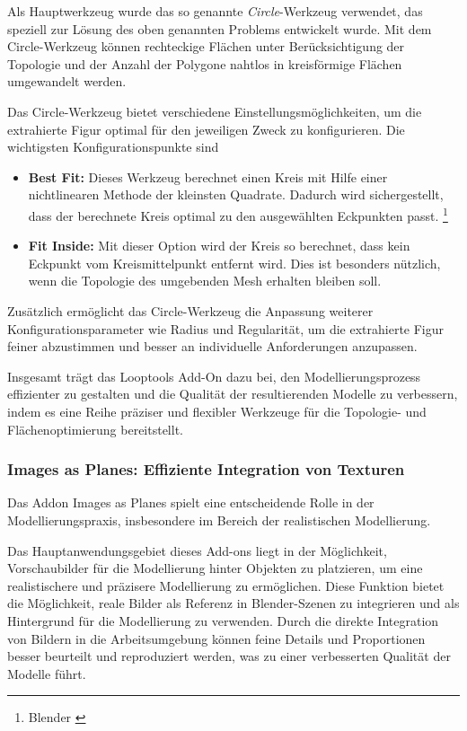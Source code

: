 Als Hauptwerkzeug wurde das so genannte \textit{Circle}-Werkzeug verwendet, das speziell zur Lösung des oben genannten Problems
entwickelt wurde. Mit dem Circle-Werkzeug können rechteckige Flächen unter Berücksichtigung der Topologie und der
Anzahl der Polygone nahtlos in kreisförmige Flächen umgewandelt werden.

Das Circle-Werkzeug bietet verschiedene Einstellungsmöglichkeiten, um die extrahierte Figur optimal für den jeweiligen
Zweck zu konfigurieren. Die wichtigsten Konfigurationspunkte sind

\begin{itemize}
    \item \textbf{Best Fit:} Dieses Werkzeug berechnet einen Kreis mit Hilfe einer nichtlinearen Methode der kleinsten
    Quadrate. Dadurch wird sichergestellt, dass der berechnete Kreis optimal zu den ausgewählten Eckpunkten passt. \footnote{Blender \cite{LoopTools}}
    \item \textbf{Fit Inside:} Mit dieser Option wird der Kreis so berechnet, dass kein Eckpunkt vom Kreismittelpunkt
    entfernt wird. Dies ist besonders nützlich, wenn die Topologie des umgebenden Mesh erhalten bleiben soll.
\end{itemize}

Zusätzlich ermöglicht das Circle-Werkzeug die Anpassung weiterer Konfigurationsparameter wie Radius und Regularität, um
die extrahierte Figur feiner abzustimmen und besser an individuelle Anforderungen anzupassen.

Insgesamt trägt das Looptools Add-On dazu bei, den Modellierungsprozess effizienter zu gestalten und die Qualität der
resultierenden Modelle zu verbessern, indem es eine Reihe präziser und flexibler Werkzeuge für die Topologie- und
Flächenoptimierung bereitstellt.

\subsubsection{Images as Planes: Effiziente Integration von Texturen}
Das Addon Images as Planes spielt eine entscheidende Rolle in der Modellierungspraxis, insbesondere im Bereich der
realistischen Modellierung.

Das Hauptanwendungsgebiet dieses Add-ons liegt in der Möglichkeit, Vorschaubilder für die Modellierung hinter Objekten
zu platzieren, um eine realistischere und präzisere Modellierung zu ermöglichen. Diese Funktion bietet die Möglichkeit,
reale Bilder als Referenz in Blender-Szenen zu integrieren und als Hintergrund für die Modellierung zu verwenden. Durch
die direkte Integration von Bildern in die Arbeitsumgebung können feine Details und Proportionen besser beurteilt und
reproduziert werden, was zu einer verbesserten Qualität der Modelle führt.

